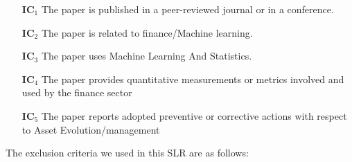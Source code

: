 \documentclass[11pt]{article}
\begin{document}
\begin{enumerate}\label{T:inclusionCriteria}

\item[\textbf{{IC}$_1$}]
The  paper  is  published  in  a  peer-reviewed  journal or in a conference. \label{Word:IC1}
\item[\textbf{{IC}$_2$}]
The  paper  is  related  to  finance/Machine learning. \label{Word:IC2}
\item[\textbf{{IC}$_3$}]
The paper uses Machine Learning And Statistics.  \label{Word:IC3}
\item[\textbf{{IC}$_4$}]
The paper provides quantitative measurements or metrics involved and used by the finance sector \label{Word:IC4}
\item[\textbf{{IC}$_5$}]
The paper reports adopted preventive or corrective actions with respect to Asset Evolution/management \label{Word:IC5}
\end{enumerate}

The exclusion criteria we used in this SLR are as follows:
\end{document}
